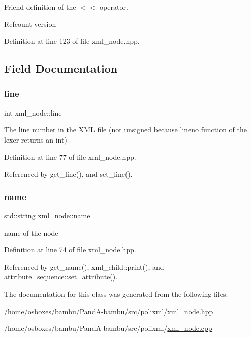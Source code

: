Friend definition of the $<$$<$ operator. 

Refcount version 

Definition at line 123 of file xml\+\_\+node.\+hpp.



\subsection{Field Documentation}
\mbox{\label{classxml__node_a3e6e3086fd295cda8b820510ce64ec0c}} 
\subsubsection{\texorpdfstring{line}{line}}
{\footnotesize\ttfamily int xml\+\_\+node\+::line\hspace{0.3cm}{\ttfamily [private]}}



The line number in the X\+ML file (not unsigned because lineno function of the lexer returns an int) 



Definition at line 77 of file xml\+\_\+node.\+hpp.



Referenced by get\+\_\+line(), and set\+\_\+line().

\mbox{\label{classxml__node_ae2af9d4ef2a866cdb4497cd6e5c34b7a}} 
\subsubsection{\texorpdfstring{name}{name}}
{\footnotesize\ttfamily std\+::string xml\+\_\+node\+::name\hspace{0.3cm}{\ttfamily [private]}}



name of the node 



Definition at line 74 of file xml\+\_\+node.\+hpp.



Referenced by get\+\_\+name(), xml\+\_\+child\+::print(), and attribute\+\_\+sequence\+::set\+\_\+attribute().



The documentation for this class was generated from the following files\+:\begin{DoxyCompactItemize}
\item 
/home/osboxes/bambu/\+Pand\+A-\/bambu/src/polixml/\hyperlink{xml__node_8hpp}{xml\+\_\+node.\+hpp}\item 
/home/osboxes/bambu/\+Pand\+A-\/bambu/src/polixml/\hyperlink{xml__node_8cpp}{xml\+\_\+node.\+cpp}\end{DoxyCompactItemize}
